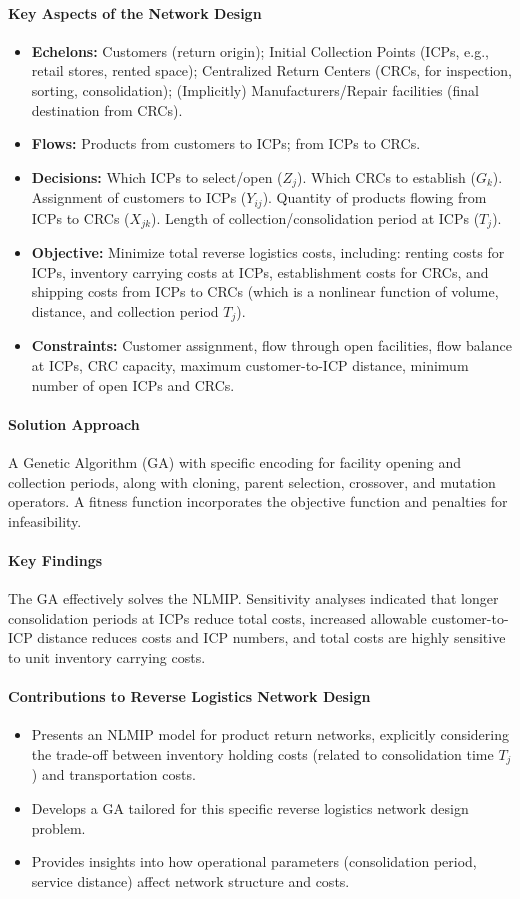 \paragraph{Key Aspects of the Network Design}
\begin{itemize}
    \item \textbf{Echelons:} Customers (return origin); Initial Collection Points (ICPs, e.g., retail stores, rented space); Centralized Return Centers (CRCs, for inspection, sorting, consolidation); (Implicitly) Manufacturers/Repair facilities (final destination from CRCs).
    \item \textbf{Flows:} Products from customers to ICPs; from ICPs to CRCs.
    \item \textbf{Decisions:} Which ICPs to select/open ($Z_j$). Which CRCs to establish ($G_k$). Assignment of customers to ICPs ($Y_{ij}$). Quantity of products flowing from ICPs to CRCs ($X_{jk}$). Length of collection/consolidation period at ICPs ($T_j$).
    \item \textbf{Objective:} Minimize total reverse logistics costs, including: renting costs for ICPs, inventory carrying costs at ICPs, establishment costs for CRCs, and shipping costs from ICPs to CRCs (which is a nonlinear function of volume, distance, and collection period $T_j$).
    \item \textbf{Constraints:} Customer assignment, flow through open facilities, flow balance at ICPs, CRC capacity, maximum customer-to-ICP distance, minimum number of open ICPs and CRCs.
\end{itemize}
\paragraph{Solution Approach} A Genetic Algorithm (GA) with specific encoding for facility opening and collection periods, along with cloning, parent selection, crossover, and mutation operators. A fitness function incorporates the objective function and penalties for infeasibility.
\paragraph{Key Findings} The GA effectively solves the NLMIP. Sensitivity analyses indicated that longer consolidation periods at ICPs reduce total costs, increased allowable customer-to-ICP distance reduces costs and ICP numbers, and total costs are highly sensitive to unit inventory carrying costs.
\paragraph{Contributions to Reverse Logistics Network Design}
\begin{itemize}
    \item Presents an NLMIP model for product return networks, explicitly considering the trade-off between inventory holding costs (related to consolidation time $T_j$) and transportation costs.
    \item Develops a GA tailored for this specific reverse logistics network design problem.
    \item Provides insights into how operational parameters (consolidation period, service distance) affect network structure and costs.
\end{itemize}
